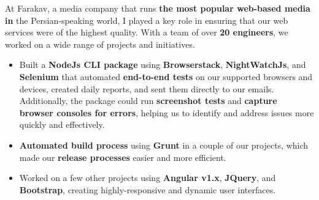At Farakav, a media company that runs \textbf{the most popular web-based media in} the Persian-speaking world, I played a key role in ensuring that our web services were of the highest quality. With a team of over \textbf{20 engineers}, we worked on a wide range of projects and initiatives.
\medskip
\begin{itemize}
    \item Built a \textbf{NodeJs CLI package} using \textbf{Browserstack}, \textbf{NightWatchJs}, and \textbf{Selenium} that automated \textbf{end-to-end tests} on our supported browsers and devices, created daily reports, and sent them directly to our emails. Additionally, the package could run \textbf{screenshot tests} and \textbf{capture browser consoles for errors}, helping us to identify and address issues more quickly and effectively.
    \item \textbf{Automated build process} using \textbf{Grunt} in a couple of our projects, which made our \textbf{release processes} easier and more efficient.
    \item Worked on a few other projects using \textbf{Angular v1.x}, \textbf{JQuery}, and \textbf{Bootstrap}, creating highly-responsive and dynamic user interfaces.
\end{itemize}

\bigskip
\divider
\bigskip

